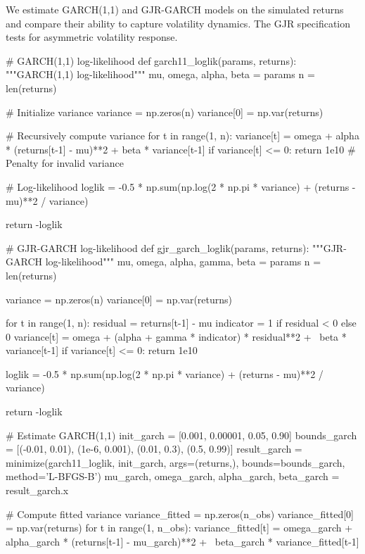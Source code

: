\documentclass[a4paper, 11pt]{article}
\begin{document}
We estimate GARCH(1,1) and GJR-GARCH models on the simulated returns and compare their ability
to capture volatility dynamics. The GJR specification tests for asymmetric volatility response.

\begin{pycode}
# GARCH(1,1) log-likelihood
def garch11_loglik(params, returns):
    """GARCH(1,1) log-likelihood"""
    mu, omega, alpha, beta = params
    n = len(returns)

    # Initialize variance
    variance = np.zeros(n)
    variance[0] = np.var(returns)

    # Recursively compute variance
    for t in range(1, n):
        variance[t] = omega + alpha * (returns[t-1] - mu)**2 + beta * variance[t-1]
        if variance[t] <= 0:
            return 1e10  # Penalty for invalid variance

    # Log-likelihood
    loglik = -0.5 * np.sum(np.log(2 * np.pi * variance) +
                            (returns - mu)**2 / variance)

    return -loglik

# GJR-GARCH log-likelihood
def gjr_garch_loglik(params, returns):
    """GJR-GARCH log-likelihood"""
    mu, omega, alpha, gamma, beta = params
    n = len(returns)

    variance = np.zeros(n)
    variance[0] = np.var(returns)

    for t in range(1, n):
        residual = returns[t-1] - mu
        indicator = 1 if residual < 0 else 0
        variance[t] = omega + (alpha + gamma * indicator) * residual**2 + \
                      beta * variance[t-1]
        if variance[t] <= 0:
            return 1e10

    loglik = -0.5 * np.sum(np.log(2 * np.pi * variance) +
                            (returns - mu)**2 / variance)

    return -loglik

# Estimate GARCH(1,1)
init_garch = [0.001, 0.00001, 0.05, 0.90]
bounds_garch = [(-0.01, 0.01), (1e-6, 0.001), (0.01, 0.3), (0.5, 0.99)]
result_garch = minimize(garch11_loglik, init_garch, args=(returns,),
                        bounds=bounds_garch, method='L-BFGS-B')
mu_garch, omega_garch, alpha_garch, beta_garch = result_garch.x

# Compute fitted variance
variance_fitted = np.zeros(n_obs)
variance_fitted[0] = np.var(returns)
for t in range(1, n_obs):
    variance_fitted[t] = omega_garch + alpha_garch * (returns[t-1] - mu_garch)**2 + \
                         beta_garch * variance_fitted[t-1]


\end{pycode}
\end{document}
